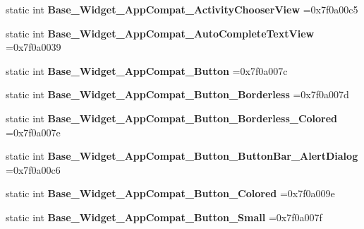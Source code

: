 \begin{DoxyCompactItemize}
static int {\bfseries Base\+\_\+\+Widget\+\_\+\+App\+Compat\+\_\+\+Activity\+Chooser\+View} =0x7f0a00c5
\item 
\mbox{\label{classandroid_1_1support_1_1v7_1_1cardview_1_1R_1_1style_a17186cc5871549b9c4e9cfd7f347042d}} 
static int {\bfseries Base\+\_\+\+Widget\+\_\+\+App\+Compat\+\_\+\+Auto\+Complete\+Text\+View} =0x7f0a0039
\item 
\mbox{\label{classandroid_1_1support_1_1v7_1_1cardview_1_1R_1_1style_ae0109ff2f6dfa98ca48b4292a396589f}} 
static int {\bfseries Base\+\_\+\+Widget\+\_\+\+App\+Compat\+\_\+\+Button} =0x7f0a007c
\item 
\mbox{\label{classandroid_1_1support_1_1v7_1_1cardview_1_1R_1_1style_a41990dcdab12f5da6b9e5fd2f50cfd68}} 
static int {\bfseries Base\+\_\+\+Widget\+\_\+\+App\+Compat\+\_\+\+Button\+\_\+\+Borderless} =0x7f0a007d
\item 
\mbox{\label{classandroid_1_1support_1_1v7_1_1cardview_1_1R_1_1style_aa20b7bb66539ea04fc411e07dbd011cb}} 
static int {\bfseries Base\+\_\+\+Widget\+\_\+\+App\+Compat\+\_\+\+Button\+\_\+\+Borderless\+\_\+\+Colored} =0x7f0a007e
\item 
\mbox{\label{classandroid_1_1support_1_1v7_1_1cardview_1_1R_1_1style_af8d51e4d1fb9ad2bac9479cde782341a}} 
static int {\bfseries Base\+\_\+\+Widget\+\_\+\+App\+Compat\+\_\+\+Button\+\_\+\+Button\+Bar\+\_\+\+Alert\+Dialog} =0x7f0a00c6
\item 
\mbox{\label{classandroid_1_1support_1_1v7_1_1cardview_1_1R_1_1style_aea4a15e1a63fc6bf7d8b0daaca62d7e0}} 
static int {\bfseries Base\+\_\+\+Widget\+\_\+\+App\+Compat\+\_\+\+Button\+\_\+\+Colored} =0x7f0a009e
\item 
\mbox{\label{classandroid_1_1support_1_1v7_1_1cardview_1_1R_1_1style_ac18d586368c5d08d8a61f059b8c11ae7}} 
static int {\bfseries Base\+\_\+\+Widget\+\_\+\+App\+Compat\+\_\+\+Button\+\_\+\+Small} =0x7f0a007f

\end{DoxyCompactItemize}
